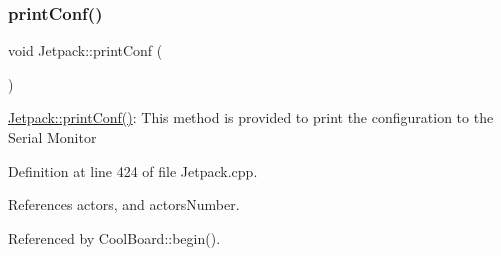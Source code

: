 \subsubsection{\texorpdfstring{print\+Conf()}{printConf()}}
{\footnotesize\ttfamily void Jetpack\+::print\+Conf (\begin{DoxyParamCaption}{ }\end{DoxyParamCaption})}

\hyperlink{classJetpack_ac54a7bb4f9166bee32052253d9b1d306}{Jetpack\+::print\+Conf()}\+: This method is provided to print the configuration to the Serial Monitor 

Definition at line 424 of file Jetpack.\+cpp.



References actors, and actors\+Number.



Referenced by Cool\+Board\+::begin().


